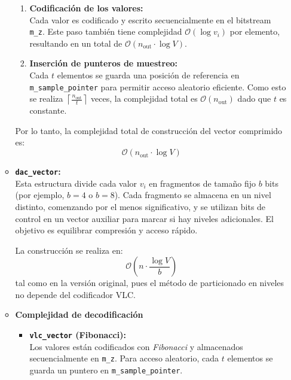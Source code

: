 \begin{enumerate}
\begin{itemize}
\begin{enumerate}
                \item \textbf{Codificación de los valores:} \\
                Cada valor es codificado y escrito secuencialmente en el bitstream \texttt{m\_z}. Este paso también tiene complejidad \(\mathcal{O}(\log v_i)\) por elemento, resultando en un total de \(\mathcal{O}(n_{\text{out}} \cdot \log V)\).
                
                \item \textbf{Inserción de punteros de muestreo:} \\
                Cada \(t\) elementos se guarda una posición de referencia en \texttt{m\_sample\_pointer} para permitir acceso aleatorio eficiente. Como esto se realiza \(\left\lceil \frac{n_{\text{out}}}{t} \right\rceil\) veces, la complejidad total es \(\mathcal{O}(n_{\text{out}})\) dado que \(t\) es constante.
            \end{enumerate}
            
            \noindent Por lo tanto, la complejidad total de construcción del vector comprimido es:
            \[
            \boxed{\mathcal{O}(n_{\text{out}} \cdot \log V)}
            \]
        
        \item \textbf{\texttt{dac\_vector}:} \\[0.5em]
            Esta estructura divide cada valor \(v_i\) en fragmentos de tamaño fijo \(b\) bits (por ejemplo, \(b = 4\) o \(b = 8\)). Cada fragmento se almacena en un nivel distinto, comenzando por el menos significativo, y se utilizan bits de control en un vector auxiliar para marcar si hay niveles adicionales. El objetivo es equilibrar compresión y acceso rápido.
            
            La construcción se realiza en:
            \[
            \boxed{\mathcal{O}\left(n \cdot \frac{\log V}{b}\right)}
            \]
            tal como en la versión original, pues el método de particionado en niveles no depende del codificador VLC.
        
        \item \textbf{Complejidad de decodificación}
        
            \begin{itemize}
                \item \textbf{\texttt{vlc\_vector} (Fibonacci):} \\
                    Los valores están codificados con \textit{Fibonacci} y almacenados secuencialmente en \texttt{m\_z}. Para acceso aleatorio, cada \(t\) elementos se guarda un puntero en \texttt{m\_sample\_pointer}.
                    

\end{itemize}
\end{itemize}
\end{enumerate}
